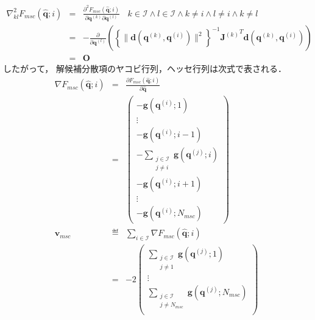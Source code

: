 \begin{subequations}
\begin{eqnarray}
  \nabla^2_{kl} F_{\mathit{msc}}(\bm{\hat{q}}; i) &=& \frac{\partial^2 F_{\mathit{msc}}(\bm{\hat{q}}; i)}{\partial \bm{q}^{(k)} \partial \bm{q}^{(l)}} \ \ \ \ k \in \mathcal{I} \land l \in \mathcal{I} \land k \not= i \land l \not= i \land k \not= l\\
  &=& - \frac{\partial}{\partial \bm{q}^{(l)}} \left( \left\{ \| \bm{d}(\bm{q}^{(k)}, \bm{q}^{(i)}) \|^2 \right\}^{-1} {\bm{J}^{(k)}}^T \bm{d}(\bm{q}^{(k)}, \bm{q}^{(i)}) \right) \\
  &=& \bm{O}
\end{eqnarray}
\end{subequations}
したがって，
解候補分散項のヤコビ行列，ヘッセ行列は次式で表される．
\begin{subequations}
\begin{eqnarray}
  \nabla F_{\mathit{msc}}(\bm{\hat{q}}; i) &=& \frac{\partial F_{\mathit{msc}}(\bm{\hat{q}}; i)}{\partial \bm{\hat{q}}} \\
  &=&
  \begin{pmatrix}
  - \bm{g}(\bm{q}^{(i)}; 1) \\
  \vdots \\
  - \bm{g}(\bm{q}^{(i)}; i-1) \\
  - \sum_{\substack{j \in \mathcal{I} \\ j \not= i}} \bm{g}(\bm{q}^{(j)}; i) \\
  - \bm{g}(\bm{q}^{(i)}; i+1) \\
  \vdots \\
  - \bm{g}(\bm{q}^{(i)}; N_{\mathit{msc}})
  \end{pmatrix} \\
  \bm{v}_{\mathit{msc}} &\eqdef&
  \sum_{i \in \mathcal{I}} \nabla F_{\mathit{msc}}(\bm{\hat{q}}; i) \\
  &=&
  - 2
  \begin{pmatrix}
  \sum_{\substack{j \in \mathcal{I} \\ j \not= 1}} \bm{g}(\bm{q}^{(j)}; 1) \\
  \vdots \\
  \sum_{\substack{j \in \mathcal{I} \\ j \not= N_{\mathit{msc}}}} \bm{g}(\bm{q}^{(j)}; N_{\mathit{msc}}) \\
  \end{pmatrix} \label{eq:sqp-msc-dispersion-matrix}
\end{eqnarray}
\end{subequations}

